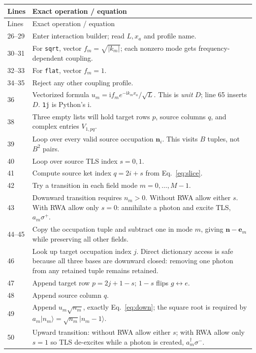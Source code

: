 \documentclass[11pt,a4paper]{article}
\newcommand{\ket}[1]{\lvert #1\rangle}
\newcommand{\code}[1]{\nolinkurl{#1}}
\newcommand{\ii}{\mathrm i}
\begin{document}
\begin{longtable}{p{}p{}}
\toprule Lines & Exact operation / equation\\\midrule\endfirsthead
\toprule Lines & Exact operation / equation\\\midrule\endhead
26--29 & Enter interaction builder; read $L,x_a$ and profile name.\\
30--31 & For \code{sqrt}, vector $f_m=\sqrt{|k_m|}$; each nonzero mode gets frequency-dependent coupling.\\
32--33 & For \code{flat}, vector $f_m=1$.\\
34--35 & Reject any other coupling profile.\\
36 & Vectorized formula $u_m=\ii f_m e^{-\ii k_mx_a}/\sqrt L$. This is \emph{unit} $D$; line 65 inserts $D$. \code{1j} is Python's $\ii$.\\
38 & Three empty lists will hold target rows $p$, source columns $q$, and complex entries $V_{1,pq}$.\\
39 & Loop over every valid source occupation $\mathbf n_i$. This visits $B$ tuples, not $B^2$ pairs.\\
40 & Loop over source TLS index $s=0,1$.\\
41 & Compute source ket index $q=2i+s$ from Eq.~\eqref{eq:slice}.\\
42 & Try a transition in each field mode $m=0,\ldots,M-1$.\\
43 & Downward transition requires $n_m>0$. Without RWA allow either $s$. With RWA allow only $s=0$: annihilate a photon and excite TLS, $a_m\sigma^+$.\\
44--45 & Copy the occupation tuple and subtract one in mode $m$, giving $\mathbf n-\mathbf e_m$ while preserving all other fields.\\
46 & Look up target occupation index $j$. Direct dictionary access is safe because all three bases are downward closed: removing one photon from any retained tuple remains retained.\\
47 & Append target row $p=2j+1-s$; $1-s$ flips $g\leftrightarrow e$.\\
48 & Append source column $q$.\\
49 & Append $u_m\sqrt{n_m}$, exactly Eq.~\eqref{eq:down}; the square root is required by $a_m\ket{n_m}=\sqrt{n_m}\ket{n_m-1}$.\\
50 & Upward transition: without RWA allow either $s$; with RWA allow only $s=1$ so TLS de-excites while a photon is created, $a_m^\dagger\sigma^-$.\\

\end{longtable}
\end{document}
